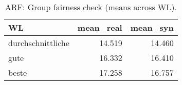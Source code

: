 \begin{table}[ht]
\centering
\begin{tabular}{lrr}
  \hline
WL & mean\_real & mean\_syn \\ 
  \hline
durchschnittliche & 14.519 & 14.460 \\ 
  gute & 16.332 & 16.410 \\ 
  beste & 17.258 & 16.757 \\ 
   \hline
\end{tabular}
\caption{ARF: Group fairness check (means across WL).} 
\label{tab:arf:fairness}
\end{table}
